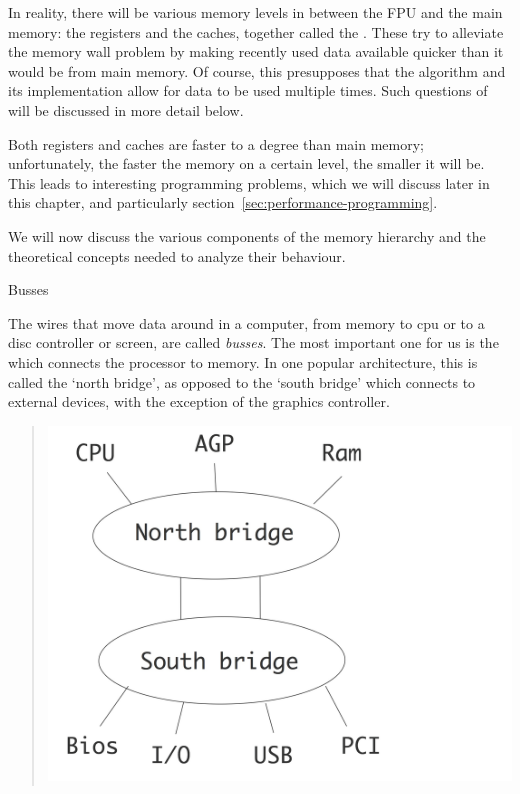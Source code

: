 In reality, there will be various memory levels in between the
\ac{FPU} and the main memory: the registers
and the caches, together called the
. These try to alleviate the memory
wall problem by making recently used data available quicker than it
would be from main memory. Of course, this presupposes that the
algorithm and its implementation allow for data to be used multiple
times.  Such questions of  will be discussed in
more detail below.

Both registers and caches are faster to a degree
than main memory; unfortunately, the faster the memory on a certain
level, the smaller it will be. This leads to interesting programming
problems, which we will discuss later in this chapter, and
particularly section~\ref{sec:performance-programming}.

We will now discuss the various components of the memory hierarchy and
the theoretical concepts needed to analyze their behaviour.

 {Busses}

The wires that move data around in a computer, from memory to cpu or
to a disc controller or screen, are called \emph{busses}. The
most important one for us is the  which connects the processor to memory. In one popular
architecture, this is called the `north bridge', as opposed to the
`south bridge' which connects to external devices, with the exception
of the graphics controller.

\begin{quote}
\includegraphics[scale=.1]{graphics-public/bridges}
\end{quote}

